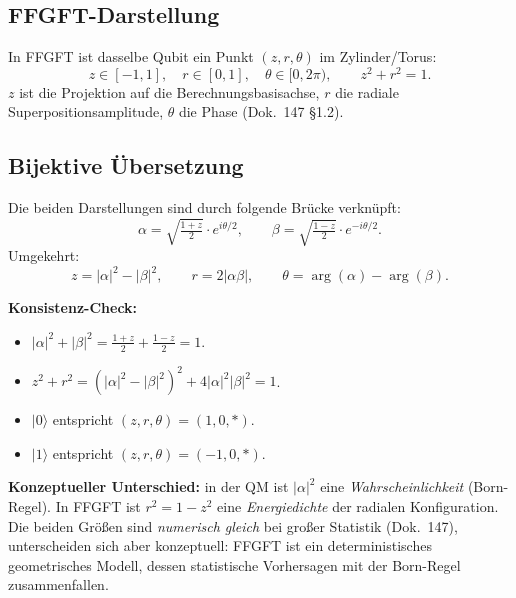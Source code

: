 \subsection{FFGFT-Darstellung}

In FFGFT ist dasselbe Qubit ein Punkt $(z, r, \theta)$ im Zylinder/Torus:
\begin{equation}
  z \in [-1, 1], \quad r \in [0, 1], \quad \theta \in [0, 2\pi),
  \qquad
  z^2 + r^2 = 1.
\end{equation}
$z$ ist die Projektion auf die Berechnungsbasisachse, $r$ die
radiale Superpositionsamplitude, $\theta$ die Phase (Dok.~147 §1.2).

\subsection{Bijektive Übersetzung}

Die beiden Darstellungen sind durch folgende Brücke verknüpft:
\begin{equation}
  \boxed{
  \alpha = \sqrt{\tfrac{1+z}{2}} \cdot e^{i\theta/2},
  \qquad
  \beta = \sqrt{\tfrac{1-z}{2}} \cdot e^{-i\theta/2}.}
  \label{eq:state-bridge}
\end{equation}
Umgekehrt:
\begin{equation}
  z = |\alpha|^2 - |\beta|^2,
  \qquad
  r = 2|\alpha\beta|,
  \qquad
  \theta = \arg(\alpha) - \arg(\beta).
\end{equation}

\textbf{Konsistenz-Check:}
\begin{itemize}[leftmargin=2em,itemsep=2pt,topsep=2pt]
  \item $|\alpha|^2 + |\beta|^2 = \tfrac{1+z}{2} + \tfrac{1-z}{2} = 1$. \checkmark
  \item $z^2 + r^2 = (|\alpha|^2 - |\beta|^2)^2 + 4|\alpha|^2|\beta|^2 = 1$. \checkmark
  \item $|0\rangle$ entspricht $(z,r,\theta) = (1, 0, *)$. \checkmark
  \item $|1\rangle$ entspricht $(z,r,\theta) = (-1, 0, *)$. \checkmark
\end{itemize}

\textbf{Konzeptueller Unterschied:} in der QM ist $|\alpha|^2$ eine
\emph{Wahrscheinlichkeit} (Born-Regel). In FFGFT ist $r^2 = 1 - z^2$
eine \emph{Energiedichte} der radialen Konfiguration. Die beiden
Größen sind \emph{numerisch gleich} bei großer Statistik (Dok.~147),
unterscheiden sich aber konzeptuell: FFGFT ist ein
deterministisches geometrisches Modell, dessen statistische
Vorhersagen mit der Born-Regel zusammenfallen.

